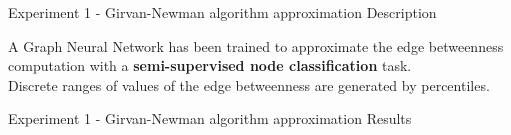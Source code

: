 \documentclass[xcolor=table]{beamer}
\begin{document}
\begin{frame}{Experiment 1 - Girvan-Newman algorithm approximation }{ Description}


A Graph Neural Network has been trained to approximate the edge betweenness computation with a \textbf{semi-supervised node classification} task.\\

Discrete ranges of values of the edge betweenness are generated by percentiles.\\


\end{frame}






\begin{frame}{Experiment 1 - Girvan-Newman algorithm approximation }{ Results}




\end{frame}
\end{document}
